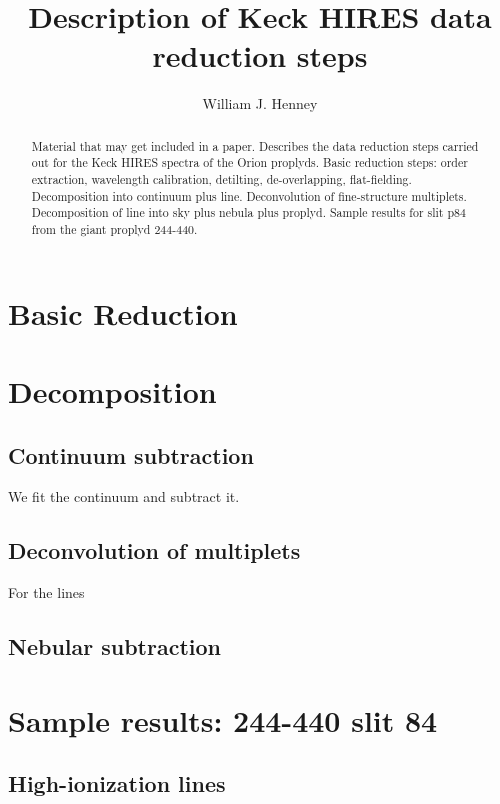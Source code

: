 \documentclass[useAMS,usenatbib]{mn2e}
\title{Description of Keck HIRES data reduction steps}
\author{William J. Henney}
\begin{document}
\maketitle
\begin{abstract}
  Material that may get included in a paper.  
  Describes the data reduction steps carried out for the 
  Keck HIRES spectra of the Orion proplyds.
  Basic reduction steps: 
  order extraction, wavelength calibration, detilting,
  de-overlapping, flat-fielding.  
  Decomposition into continuum plus line.  
  Deconvolution of fine-structure multiplets. 
  Decomposition of line into sky plus nebula plus proplyd. 
  Sample results for slit p84 
  from the giant proplyd 244-440. 
\end{abstract}

\section{Basic Reduction}
\label{sec:basic}



\section{Decomposition}
\label{sec:decomp}

\subsection{Continuum subtraction}
\label{sec:cont}

We fit the continuum and subtract it. 

\subsection{Deconvolution of multiplets}
\label{sec:deconv}


For the  lines 

\subsection{Nebular subtraction}
\label{sec:neb}



\section{Sample results: 244-440 slit 84}
\label{sec:sample}


\subsection{High-ionization lines}
\label{sec:high}
\end{document}
